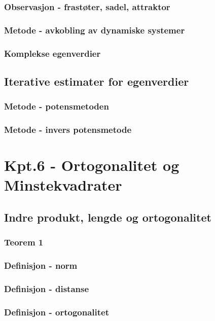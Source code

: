 \documentclass{article}
\begin{document}
      \subsubsection{Observasjon - frastøter, sadel, attraktor}
        
      \subsubsection{Metode - avkobling av dynamiske systemer}
        
      \subsubsection{Komplekse egenverdier}
        
    \subsection{Iterative estimater for egenverdier}
      \subsubsection{Metode - potensmetoden}
        
      \subsubsection{Metode - invers potensmetode}
        
  \section{Kpt.6 - Ortogonalitet og Minstekvadrater}
    \subsection{Indre produkt, lengde og ortogonalitet}
      \subsubsection{Teorem 1}
        
      \subsubsection{Definisjon - norm}
        
      \subsubsection{Definisjon - distanse}
        
      \subsubsection{Definisjon - ortogonalitet}
        
\end{document}
